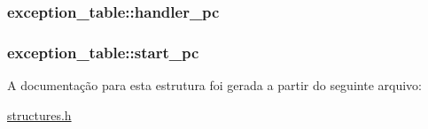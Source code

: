 \subsubsection[{\texorpdfstring{handler\+\_\+pc}{handler_pc}}]{ exception\+\_\+table\+::handler\+\_\+pc}\hypertarget{structexception__table_a8fe6fb5063598ad0d48aab5e617d6a35}{}\label{structexception__table_a8fe6fb5063598ad0d48aab5e617d6a35}
\subsubsection[{\texorpdfstring{start\+\_\+pc}{start_pc}}]{ exception\+\_\+table\+::start\+\_\+pc}\hypertarget{structexception__table_a63da93a2b0f5dc61b3a158a0c7384602}{}\label{structexception__table_a63da93a2b0f5dc61b3a158a0c7384602}


A documentação para esta estrutura foi gerada a partir do seguinte arquivo\+:\begin{DoxyCompactItemize}
\item 
\hyperlink{structures_8h}{structures.\+h}\end{DoxyCompactItemize}
